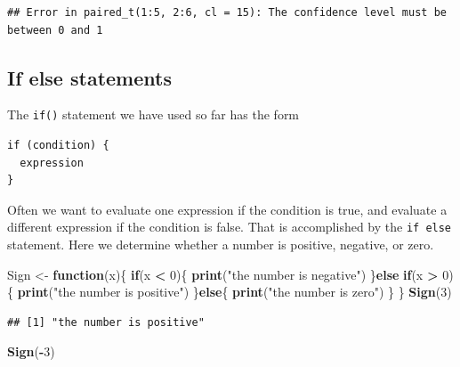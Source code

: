 \documentclass[
]{krantz}
\newenvironment{Shaded}{\begin{snugshade}}{\end{snugshade}}
\newcommand{\ControlFlowTok}[1]{\textcolor[rgb]{0.13,0.29,0.53}{\textbf{#1}}}
\newcommand{\DecValTok}[1]{\textcolor[rgb]{0.00,0.00,0.81}{#1}}
\newcommand{\KeywordTok}[1]{\textcolor[rgb]{0.13,0.29,0.53}{\textbf{#1}}}
\newcommand{\NormalTok}[1]{#1}
\newcommand{\OperatorTok}[1]{\textcolor[rgb]{0.81,0.36,0.00}{\textbf{#1}}}
\newcommand{\StringTok}[1]{\textcolor[rgb]{0.31,0.60,0.02}{#1}}
\begin{document}
\begin{verbatim}
## Error in paired_t(1:5, 2:6, cl = 15): The confidence level must be between 0 and 1
\end{verbatim}

\hypertarget{if-else-statements}{%
\subsection{If else statements}\label{if-else-statements}}

The \texttt{if()} statement we have used so far has the form

\begin{verbatim}
if (condition) {
  expression
}
\end{verbatim}

Often we want to evaluate one expression if the condition is true, and evaluate a different expression if the condition is false. That is accomplished by the \texttt{if\ else} statement. Here we determine whether a number is positive, negative, or zero.

\begin{Shaded}
\begin{Highlighting}[]
\NormalTok{Sign \textless{}{-}}\StringTok{ }\ControlFlowTok{function}\NormalTok{(x)\{}
    \ControlFlowTok{if}\NormalTok{(x }\OperatorTok{\textless{}}\StringTok{ }\DecValTok{0}\NormalTok{)\{}
        \KeywordTok{print}\NormalTok{(}\StringTok{"the number is negative"}\NormalTok{)}
\NormalTok{    \}}\ControlFlowTok{else} \ControlFlowTok{if}\NormalTok{(x }\OperatorTok{\textgreater{}}\StringTok{ }\DecValTok{0}\NormalTok{)\{}
        \KeywordTok{print}\NormalTok{(}\StringTok{"the number is positive"}\NormalTok{)}
\NormalTok{    \}}\ControlFlowTok{else}\NormalTok{\{}
        \KeywordTok{print}\NormalTok{(}\StringTok{"the number is zero"}\NormalTok{)}
\NormalTok{    \}}
\NormalTok{\}}
\KeywordTok{Sign}\NormalTok{(}\DecValTok{3}\NormalTok{)}
\end{Highlighting}
\end{Shaded}

\begin{verbatim}
## [1] "the number is positive"
\end{verbatim}

\begin{Shaded}
\begin{Highlighting}[]
\KeywordTok{Sign}\NormalTok{(}\OperatorTok{{-}}\DecValTok{3}\NormalTok{)}
\end{Highlighting}
\end{Shaded}
\end{document}
